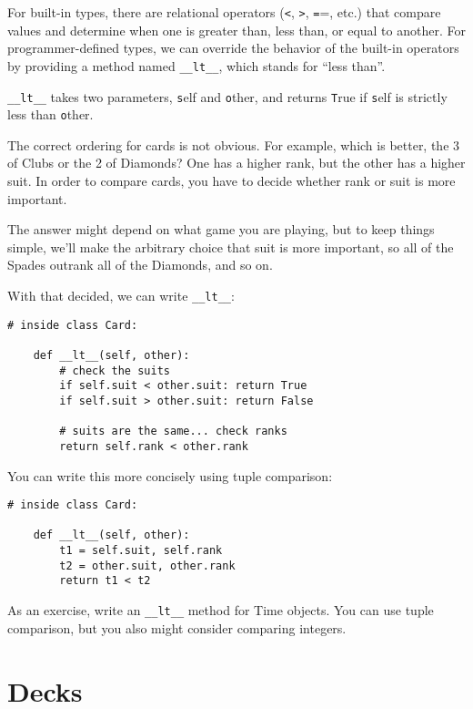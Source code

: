 \documentclass[
DIV=11,
fontsize=12,
twoside,
headinclude=false,
titlepage=firstiscover,
abstract=true,
headsepline=true,
footsepline=true,
chapterprefix=true, %
headings=big,
bibliography=totoc,%
captions=tableheading
]{scrbook}
\theoremstyle{definition}
\begin{document}
For built-in types, there are relational operators
({\texttt <}, {\texttt >}, {\texttt ==}, etc.)
that compare
values and determine when one is greater than, less than, or equal to
another.  For programmer-defined types, we can override the behavior of
the built-in operators by providing a method named
\verb"__lt__", which stands for ``less than''.

\verb"__lt__" takes two parameters, {\texttt self} and {\texttt other},
and returns {\texttt True} if {\texttt self} is strictly less than {\texttt other}.

The correct ordering for cards is not obvious.
For example, which
is better, the 3 of Clubs or the 2 of Diamonds?  One has a higher
rank, but the other has a higher suit.  In order to compare
cards, you have to decide whether rank or suit is more important.

The answer might depend on what game you are playing, but to keep
things simple, we'll make the arbitrary choice that suit is more
important, so all of the Spades outrank all of the Diamonds,
and so on.

With that decided, we can write \verb"__lt__":

\begin{lstlisting}
# inside class Card:

    def __lt__(self, other):
        # check the suits
        if self.suit < other.suit: return True
        if self.suit > other.suit: return False

        # suits are the same... check ranks
        return self.rank < other.rank
\end{lstlisting}
%
You can write this more concisely using tuple comparison:

\begin{lstlisting}
# inside class Card:

    def __lt__(self, other):
        t1 = self.suit, self.rank
        t2 = other.suit, other.rank
        return t1 < t2
\end{lstlisting}
%
As an exercise, write an \verb"__lt__" method for Time objects.  You
can use tuple comparison, but you also might consider 
comparing integers.


\section{Decks}
\end{document}
